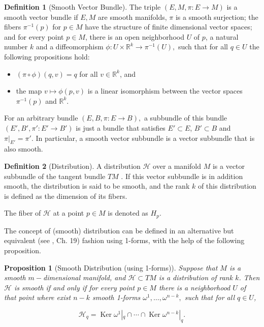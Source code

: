 \documentclass[12pt, letterpaper, reqno]{amsart}
\theoremstyle{definition}
\newtheorem{df}{Definition}
\theoremstyle{plain}
\newtheorem{prop}{Proposition}
\theoremstyle{remark}
\begin{document}
\begin{df}[Smooth Vector Bundle]\label{def:smooth_vector_bundle}
	The triple $ (E, M, \pi: E \rightarrow {M}) $ is a smooth vector bundle if $ E,M $ are smooth manifolds, $ \pi $ is a smooth surjection; the fibers $ \pi^{-1}(p) $ for $ p\in M $  have the structure of finite dimensional vector spaces; and for every point $ p\in M $, there is an open neighborhood $ U $ of $ p $, a natural number $ k $ and a diffeomorphism $ \phi: U\times \mathbb{R}^k \rightarrow  \pi^{-1}(U),$ such that for all $ q\in U $ the following propositions hold:  

	\begin{itemize}
		\item $ (\pi\circ \phi)(q,v)=q $ for all $ v\in \mathbb{R}^k $, and  
		\item the map $ v \mapsto \phi(p,v) $ is a linear isomorphism between the vector spaces $\pi^{-1}(p) $ and $ \mathbb{R}^k. $     
	\end{itemize}
	
\end{df}

For an arbitrary bundle $ (E,B,\pi:E \rightarrow {B}), $ a subbundle of this bundle $ (E',B',\pi':E' \rightarrow {B'}) $  is just a bundle that satisfies $ E'\subset E $, $ B'\subset B $ and $ \pi|_{E'}=\pi'. $ In particular, a smooth vector subbundle is a vector subbundle that is also smooth. 
\begin{df}[Distribution]
	
	A distribution $ \mathcal{H} $ over a manifold $ M $  is a vector subbundle of the tangent bundle $ TM $ . If this vector subbundle is in addition smooth, the distribution is said to be smooth, and the rank $ k $  of this distribution is defined as the dimension of its fibers.

	The fiber of $ \mathcal{H} $ at a point $ p\in M $ is denoted as $ H_p. $ 
\end{df}

The concept of (smooth) distribution can be defined in an alternative but equivalent (see \cite{lee2003introduction}, Ch. 19) fashion using 1-forms, with the help of the following proposition.

\begin{prop}[Smooth Distribution (using 1-forms)]
	Suppose that $ M $ is a smooth $ m- $dimensional manifold, and $ \mathcal{H} \subset TM$ is a distribution of rank $k$. Then $ \mathcal{H} $ is smooth if and only if for every point $ p\in M $ there is a neighborhood $ U $ of that point where exist $n-k$ smooth 1-forms $ \omega^1,\dots,\omega^{n-k}, $ such that for all $ q\in U $,

	$$ \mathcal{H}_q = \operatorname{Ker} \omega^1|_q\cap \cdots \cap\operatorname{Ker} \omega^{n-k}|_q.  $$ 
\end{prop}
\end{document}
